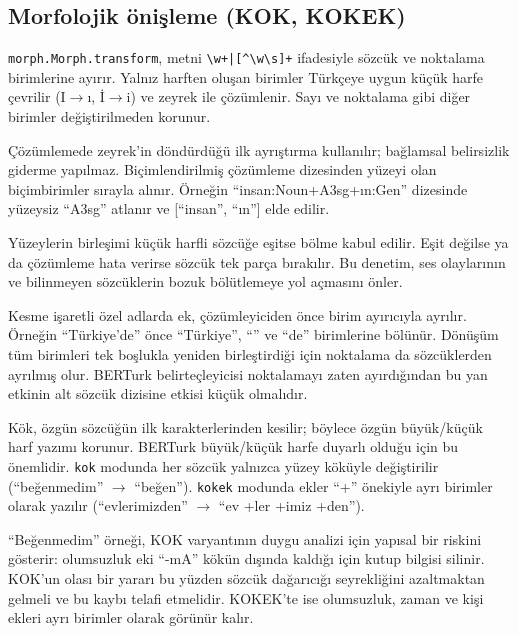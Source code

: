 \documentclass[11pt]{article}
\begin{document}
\subsection{Morfolojik önişleme (KOK, KOKEK)}

\texttt{morph.\allowbreak{}\allowbreak{}Morph.\allowbreak{}\allowbreak{}transform}, metni \texttt{\textbackslash{}\allowbreak{}w+|[\^{}\allowbreak{}\textbackslash{}\allowbreak{}w\textbackslash{}\allowbreak{}s]+} ifadesiyle sözcük ve noktalama birimlerine ayırır. Yalnız harften oluşan birimler Türkçeye uygun küçük harfe çevrilir (I$\rightarrow$ı, İ$\rightarrow$i) ve zeyrek \citep{zeyrek} ile çözümlenir. Sayı ve noktalama gibi diğer birimler değiştirilmeden korunur.

Çözümlemede zeyrek'in döndürdüğü ilk ayrıştırma kullanılır; bağlamsal belirsizlik giderme yapılmaz. Biçimlendirilmiş çözümleme dizesinden yüzeyi olan biçimbirimler sırayla alınır. Örneğin ``insan:Noun+A3sg+ın:Gen'' dizesinde yüzeysiz ``A3sg'' atlanır ve [``insan'', ``ın''] elde edilir.

Yüzeylerin birleşimi küçük harfli sözcüğe eşitse bölme kabul edilir. Eşit değilse ya da çözümleme hata verirse sözcük tek parça bırakılır. Bu denetim, ses olaylarının ve bilinmeyen sözcüklerin bozuk bölütlemeye yol açmasını önler.

Kesme işaretli özel adlarda ek, çözümleyiciden önce birim ayırıcıyla ayrılır. Örneğin ``Türkiye'de'' önce ``Türkiye'', ``\textquotesingle{}'' ve ``de'' birimlerine bölünür. Dönüşüm tüm birimleri tek boşlukla yeniden birleştirdiği için noktalama da sözcüklerden ayrılmış olur. BERTurk belirteçleyicisi noktalamayı zaten ayırdığından bu yan etkinin alt sözcük dizisine etkisi küçük olmalıdır.

Kök, özgün sözcüğün ilk karakterlerinden kesilir; böylece özgün büyük/\allowbreak{}küçük harf yazımı korunur. BERTurk büyük/\allowbreak{}küçük harfe duyarlı olduğu için bu önemlidir. \texttt{kok} modunda her sözcük yalnızca yüzey köküyle değiştirilir (``beğenmedim'' $\rightarrow$ ``beğen''). \texttt{kokek} modunda ekler ``+'' önekiyle ayrı birimler olarak yazılır (``evlerimizden'' $\rightarrow$ ``ev +ler +imiz +den'').

``Beğenmedim'' örneği, KOK varyantının duygu analizi için yapısal bir riskini gösterir: olumsuzluk eki ``-mA'' kökün dışında kaldığı için kutup bilgisi silinir. KOK'un olası bir yararı bu yüzden sözcük dağarıcığı seyrekliğini azaltmaktan gelmeli ve bu kaybı telafi etmelidir. KOKEK'te ise olumsuzluk, zaman ve kişi ekleri ayrı birimler olarak görünür kalır.
\end{document}
